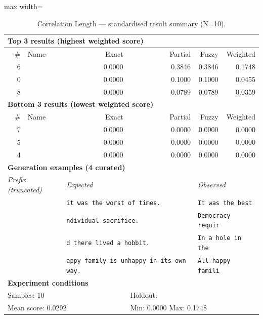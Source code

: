 \begin{table}[htbp]
\centering
\caption{Correlation Length — standardised result summary (N=10).}
\label{tab:correlation_length_summary}
\begin{adjustbox}{max width=\textwidth}
\begin{tabular}{r p{5cm} r r r r}
\toprule
\multicolumn{6}{l}{\textbf{Top 3 results (highest weighted score)}} \\
\midrule
\# & Name & Exact & Partial & Fuzzy & Weighted \\
\midrule
6 &  & 0.0000 & 0.3846 & 0.3846 & 0.1748 \\
0 &  & 0.0000 & 0.1000 & 0.1000 & 0.0455 \\
8 &  & 0.0000 & 0.0789 & 0.0789 & 0.0359 \\
\midrule
\multicolumn{6}{l}{\textbf{Bottom 3 results (lowest weighted score)}} \\
\midrule
\# & Name & Exact & Partial & Fuzzy & Weighted \\
\midrule
7 &  & 0.0000 & 0.0000 & 0.0000 & 0.0000 \\
5 &  & 0.0000 & 0.0000 & 0.0000 & 0.0000 \\
4 &  & 0.0000 & 0.0000 & 0.0000 & 0.0000 \\
\midrule
\multicolumn{6}{l}{\textbf{Generation examples (4 curated)}} \\
\midrule
\multicolumn{2}{l}{\textit{Prefix (truncated)}} & \multicolumn{2}{l}{\textit{Expected}} & \multicolumn{2}{l}{\textit{Observed}} \\
\midrule
\multicolumn{2}{l}{\texttt{}} & \multicolumn{2}{l}{\texttt{it was the worst of times.}} & \multicolumn{2}{l}{\texttt{It was the best}} \\
\multicolumn{2}{l}{\texttt{}} & \multicolumn{2}{l}{\texttt{ndividual sacrifice.}} & \multicolumn{2}{l}{\texttt{Democracy requir}} \\
\multicolumn{2}{l}{\texttt{}} & \multicolumn{2}{l}{\texttt{d there lived a hobbit.}} & \multicolumn{2}{l}{\texttt{In a hole in the}} \\
\multicolumn{2}{l}{\texttt{}} & \multicolumn{2}{l}{\texttt{appy family is unhappy in its own way.}} & \multicolumn{2}{l}{\texttt{All happy famili}} \\
\midrule
\multicolumn{6}{l}{\textbf{Experiment conditions}} \\
\midrule
\multicolumn{3}{l}{Samples: 10} & \multicolumn{3}{l}{Holdout: } \\
\multicolumn{3}{l}{Mean score: 0.0292} & \multicolumn{3}{l}{Min: 0.0000 \quad Max: 0.1748} \\

\end{tabular}
\end{adjustbox}
\end{table}
